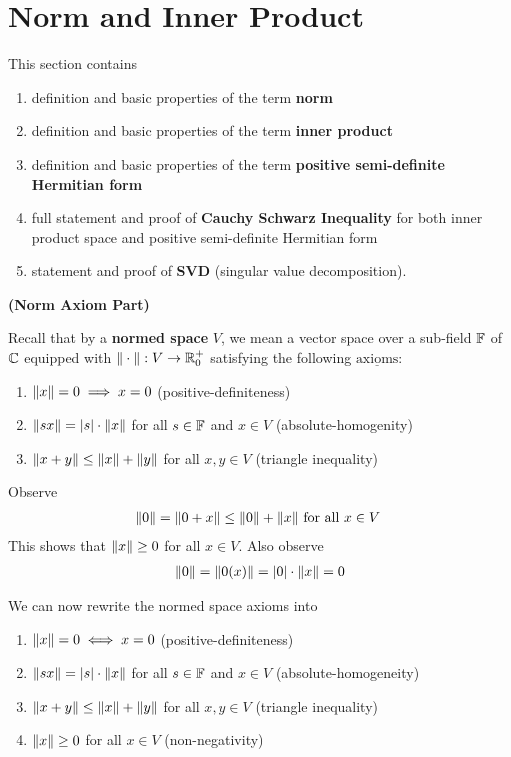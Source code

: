 \documentclass{report}
\begin{document}
\section{Norm and Inner Product}
\begin{mdframed}
This section contains
\begin{enumerate}[label=(\alph*)]
  \item definition and basic properties of the term \textbf{norm}
  \item definition and basic properties of the term \textbf{inner product}
  \item definition and basic properties of the term \textbf{positive semi-definite Hermitian form}
  \item full statement and proof of \textbf{Cauchy Schwarz Inequality} for both inner product space and positive semi-definite Hermitian form  
  \item statement and proof of \textbf{SVD} (singular value decomposition). 
\end{enumerate}
\end{mdframed}
\textbf{(Norm Axiom Part)}
\begin{mdframed}
Recall that by a \textbf{normed space} $V$, we mean a vector space over a sub-field $\mathbb{F}$ of $\mathbb{C}$ equipped with  $\| \cdot \|:V\to \mathbb{R}_0^+$ satisfying the following $\underline{\text{axioms}}$: 
\begin{enumerate}[label=(\alph*)]
  \item $\| x \|=0 \implies x=0$ (positive-definiteness)
  \item $\| sx \|=\left|s\right|\cdot \| x \|$ for all $s \in \mathbb{F}$ and $x\in V$ (absolute-homogenity)
  \item $\| x+y \|\leq \| x \|+\| y \|$ for all $x,y \in V$ (triangle inequality)
\end{enumerate}
Observe
\begin{align*}
\| 0 \|=\| 0+x \|\leq \| 0 \|+\| x \|\text{ for all $x\in V$ }
\end{align*}
This shows that $\| x \|\geq 0$ for all $x\in V$. Also observe 
\begin{align*}
\| 0 \|=\| 0(x) \|=\left|0\right|\cdot \| x \|=0
\end{align*}

We can now rewrite the normed space axioms into
\begin{enumerate}[label=(\alph*)]
  \item $\| x \|=0\iff x=0$ (positive-definiteness)
  \item $\| sx \|=\left|s\right|\cdot \| x \|$ for all $s \in \mathbb{F}$ and $x\in V$ (absolute-homogeneity)
  \item $\| x+y \|\leq \| x \|+\| y \|$ for all $x,y \in V$ (triangle inequality)
  \item $\| x \|\geq 0$ for all $x \in V$ (non-negativity)
\end{enumerate}
\end{mdframed}
\end{document}
